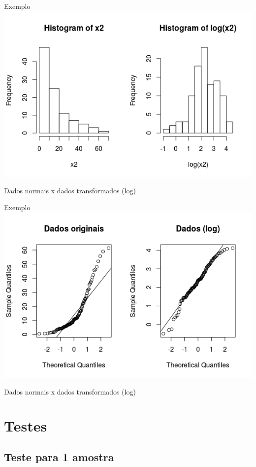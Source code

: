 \documentclass{beamer}
\begin{document}
\begin{frame}{Exemplo}
  \centering
  \includegraphics[width=\textwidth]{Nao_Param/transf-h}

Dados normais x dados transformados (log)
\end{frame}

\begin{frame}{Exemplo}
  \centering
  \includegraphics[width=\textwidth]{Nao_Param/transf-qq}

Dados normais x dados transformados (log)
\end{frame}

\section{Testes}

\subsection[1 amostra]{Teste para 1 amostra}
\end{document}

